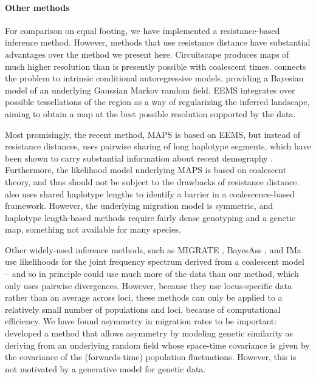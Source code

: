 \documentclass{article}
\begin{document}
\paragraph{Other methods}
For comparison on equal footing, we have implemented a resistance-based inference method.
However, methods that use resistance distance have substantial advantages over the method we present here.
Circuitscape \citep{mcrae2008using} produces maps of much higher resolution 
than is presently possible with coalescent times.
\citet{hanks2013circuit} connects the problem to intrinsic conditional autoregressive models, 
providing a Bayesian model of an underlying Gaussian Markov random field.
EEMS \citep{petkova2014visualizing} integrates over possible tessellations of the region
as a way of regularizing the inferred landscape,
aiming to obtain a map at the best possible resolution supported by the data.

Most promisingly, the recent method, MAPS \citep{alasadi2018estimating}
is based on EEMS, but instead of resistance distances,
uses pairwise sharing of long haplotype segments,
which have been shown to carry substantial information about recent demography
\citep{ralph2013geography,palamara2013inference,browning2015accurate,ringbauer2017inferring}.
Furthermore, the likelihood model underlying MAPS is based on coalescent theory,
and thus should not be subject to the drawbacks of resistance distance.
\citet{ringbauer2018estimating} also uses shared haplotype lengths
to identify a barrier in a coalescence-based framework.
However, the underlying migration model is symmetric,
and haplotype length-based methods require fairly dense genotyping and a genetic map,
something not available for many species.

Other widely-used inference methods, such as
MIGRATE \citep{beerli1999maximumlikelihood,beerli2010unified},
BayesAss \citep{wilson2003bayesian}, 
and IMa \citep{hey2007integration}
use likelihoods for the joint frequency spectrum derived from a coalescent model --
and so in principle could use much more of the data than our method,
which only uses pairwise divergences.
However, because they use locus-specific data rather than an average across loci,
these methods can only be applied to a relatively small number of populations and loci,
because of computational efficiency.
We have found asymmetry in migration rates to be important:
\citet{hanks2017modeling} developed a method that allows asymmetry
by modeling genetic similarity as deriving from an underlying random field
whose space-time covariance is given by the covariance of the (forwards-time) population fluctuations.
However, this is not motivated by a generative model for genetic data.
\end{document}

